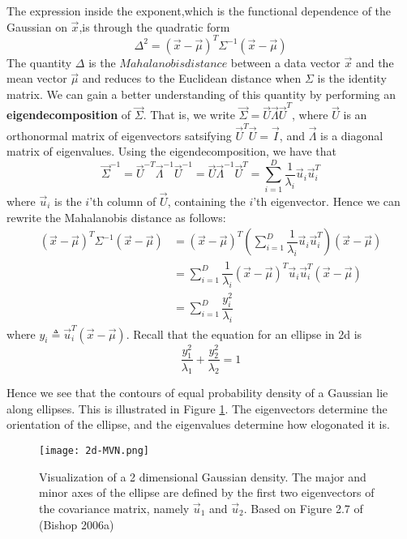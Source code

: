 The expression inside the exponent,which is the functional dependence of the Gaussian on $\vec{x}$,is through the quadratic form
\begin{equation}\label{eqn:Gaussian quadratic form}
\Delta^2 = (\vec{x}-\vec{\mu})^T\Sigma^{-1}(\vec{x}-\vec{\mu})
\end{equation}
The quantity $\Delta$ is the $Mahalanobis distance$ between a data vector $\vec{x}$ and the mean vector $\vec{\mu}$ and reduces to the Euclidean distance when $\Sigma$ is the identity matrix. We can gain a better understanding of this quantity by performing an \textbf{eigendecomposition} of $\vec{\Sigma}$. That is, we write $\vec{\Sigma}=\vec{U}\vec{\Lambda}\vec{U}^T$, where $\vec{U}$ is an orthonormal matrix of eigenvectors satsifying $\vec{U}^T\vec{U}=\vec{I}$, and $\vec{\Lambda}$ is a diagonal matrix of eigenvalues. Using the eigendecomposition, we have that
\begin{equation}
\vec{\Sigma}^{-1}=\vec{U}^{-T}\vec{\Lambda}^{-1}\vec{U}^{-1}=\vec{U}\vec{\Lambda}^{-1}\vec{U}^T=\sum\limits_{i=1}^D \dfrac{1}{\lambda_i}\vec{u}_i\vec{u}_i^T
\end{equation}
where $\vec{u}_i$ is the $i$'th column of $\vec{U}$, containing the $i$'th eigenvector. Hence we can rewrite the Mahalanobis distance as follows:
\begin{align}
(\vec{x}-\vec{\mu})^T\Sigma^{-1}(\vec{x}-\vec{\mu}) & =(\vec{x}-\vec{\mu})^T\left(\sum\limits_{i=1}^D \dfrac{1}{\lambda_i}\vec{u}_i\vec{u}_i^T\right)(\vec{x}-\vec{\mu}) \\
& =\sum\limits_{i=1}^D \dfrac{1}{\lambda_i}(\vec{x}-\vec{\mu})^T\vec{u}_i\vec{u}_i^T(\vec{x}-\vec{\mu}) \\
& =\sum\limits_{i=1}^D \dfrac{y_i^2}{\lambda_i}
\end{align}
where $y_i \triangleq \vec{u}_i^T(\vec{x}-\vec{\mu})$. Recall that the equation for an ellipse in 2d is
\begin{equation}
\dfrac{y_1^2}{\lambda_1}+\dfrac{y_2^2}{\lambda_2}=1
\end{equation}

Hence we see that the contours of equal probability density of a Gaussian lie along ellipses. This is illustrated in Figure \ref{fig:2d-MVN}. The eigenvectors determine the orientation of the ellipse, and the eigenvalues determine how elogonated it is.

\begin{figure}[hbtp]
	\centering
	\texttt{[image: 2d-MVN.png]}
	\caption{Visualization of a 2 dimensional Gaussian density. The major and minor axes of the ellipse are defined by the first two eigenvectors of the covariance matrix, namely $\vec{u}_1$ and $\vec{u}_2$. Based on Figure 2.7 of (Bishop 2006a)}
	\label{fig:2d-MVN} 
\end{figure}

